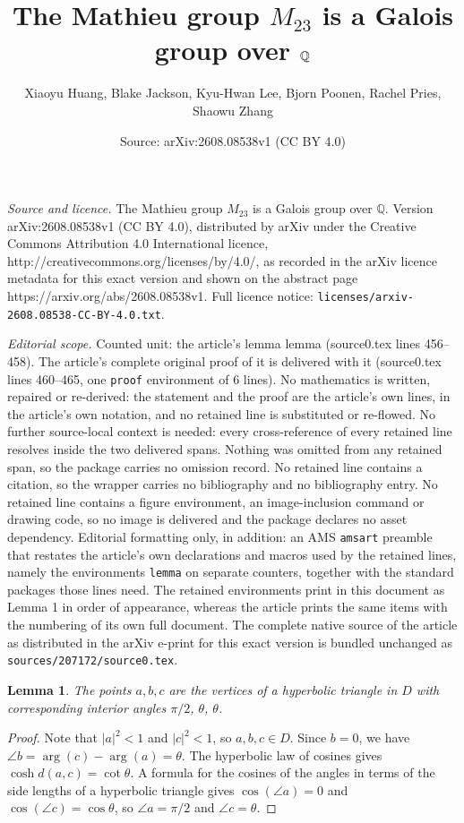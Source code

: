 \documentclass[10pt,a4paper]{amsart}
\title{The Mathieu group $M_{23}$ is a Galois group over $\Q$}
\author{Xiaoyu Huang, Blake Jackson, Kyu-Hwan Lee, Bjorn Poonen, Rachel Pries, Shaowu Zhang}
\date{Source: arXiv:2608.08538v1 (CC BY 4.0)}
\newcommand{\Q}{\mathbb{Q}}
\newtheorem{lemma}{Lemma}
\begin{document}
\maketitle

\noindent\emph{Source and licence.} The Mathieu group $M_{23}$ is a Galois group over $\Q$. Version arXiv:2608.08538v1 (CC BY 4.0), distributed by arXiv under the Creative Commons Attribution 4.0 International licence, http://creativecommons.org/licenses/by/4.0/, as recorded in the arXiv licence metadata for this exact version and shown on the abstract page https://arxiv.org/abs/2608.08538v1. Full licence notice: \texttt{licenses/arxiv-2608.08538-CC-BY-4.0.txt}.\par\smallskip

\noindent\textit{Editorial scope.} Counted unit: the article's lemma lemma (source0.tex lines 456--458). The article's complete original proof of it is delivered with it (source0.tex lines 460--465, one \texttt{proof} environment of 6 lines). No mathematics is written, repaired or re-derived: the statement and the proof are the article's own lines, in the article's own notation, and no retained line is substituted or re-flowed.  No further source-local context is needed: every cross-reference of every retained line resolves inside the two delivered spans.  Nothing was omitted from any retained span, so the package carries no omission record.  No retained line contains a citation, so the wrapper carries no bibliography and no bibliography entry.  No retained line contains a figure environment, an image-inclusion command or drawing code, so no image is delivered and the package declares no asset dependency.  Editorial formatting only, in addition: an AMS \texttt{amsart} preamble that restates the article's own declarations and macros used by the retained lines, namely the environments \texttt{lemma} on separate counters, together with the standard packages those lines need.  The retained environments print in this document as Lemma 1 in order of appearance, whereas the article prints the same items with the numbering of its own full document.  The complete native source of the article as distributed in the arXiv e-print for this exact version is bundled unchanged as \texttt{sources/207172/source0.tex}.
\begin{lemma}
  The points $a,b,c$ are the vertices of a hyperbolic triangle in $D$ with corresponding interior angles $\pi/2$, $\theta$, $\theta$. 
\end{lemma}

\begin{proof}
Note that $|a|^2 < 1$ and $|c|^2 < 1$, so $a,b,c \in D$.
Since $b=0$, we have $\angle b = \arg(c) - \arg(a) = \theta$.
The hyperbolic law of cosines gives $\cosh d(a,c) = \cot \theta$.
A formula for the cosines of the angles in terms of the side lengths of a hyperbolic triangle gives $\cos(\angle a) = 0$ and $\cos(\angle c) = \cos \theta$, so $\angle a = \pi/2$ and $\angle c = \theta$.
\end{proof}
\end{document}

